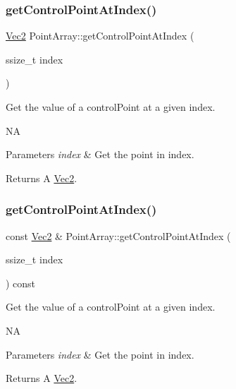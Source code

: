 \subsubsection{\texorpdfstring{get\+Control\+Point\+At\+Index()}{getControlPointAtIndex()}\hspace{0.1cm}{\footnotesize\ttfamily [1/2]}}
{\footnotesize\ttfamily \hyperlink{classVec2}{Vec2} Point\+Array\+::get\+Control\+Point\+At\+Index (\begin{DoxyParamCaption}\item[{ssize\+\_\+t}]{index }\end{DoxyParamCaption})}

Get the value of a control\+Point at a given index.

NA 
\begin{DoxyParams}{Parameters}
{\em index} & Get the point in index. \\
\hline
\end{DoxyParams}
\begin{DoxyReturn}{Returns}
A \hyperlink{classVec2}{Vec2}. 
\end{DoxyReturn}
\mbox{\label{classPointArray_a5e6ab5f80fac3c27d0b0a91709113115}} 
\subsubsection{\texorpdfstring{get\+Control\+Point\+At\+Index()}{getControlPointAtIndex()}\hspace{0.1cm}{\footnotesize\ttfamily [2/2]}}
{\footnotesize\ttfamily const \hyperlink{classVec2}{Vec2} \& Point\+Array\+::get\+Control\+Point\+At\+Index (\begin{DoxyParamCaption}\item[{ssize\+\_\+t}]{index }\end{DoxyParamCaption}) const}

Get the value of a control\+Point at a given index.

NA 
\begin{DoxyParams}{Parameters}
{\em index} & Get the point in index. \\
\hline
\end{DoxyParams}
\begin{DoxyReturn}{Returns}
A \hyperlink{classVec2}{Vec2}. 
\end{DoxyReturn}
\mbox{\label{classPointArray_a7eb8e79549b923d061e90f8fc3a34425}} 
